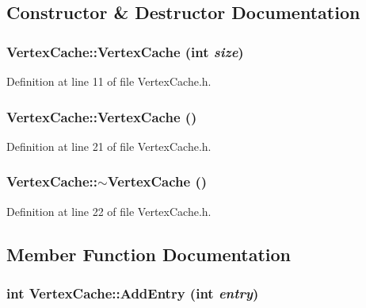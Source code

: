 \subsection{Constructor \& Destructor Documentation}
\hypertarget{class_vertex_cache_587d829d8f0a42dabaa227b15e0ac112}{
\subsubsection[{VertexCache}]{\setlength{\rightskip}{0pt plus 5cm}VertexCache::VertexCache (int {\em size})}}
\label{class_vertex_cache_587d829d8f0a42dabaa227b15e0ac112}




Definition at line 11 of file VertexCache.h.\hypertarget{class_vertex_cache_0cba52679f1eb2fa5567b1a0a3c50df6}{
\subsubsection[{VertexCache}]{\setlength{\rightskip}{0pt plus 5cm}VertexCache::VertexCache ()}}
\label{class_vertex_cache_0cba52679f1eb2fa5567b1a0a3c50df6}




Definition at line 21 of file VertexCache.h.\hypertarget{class_vertex_cache_a2fa6694132b839b3c7faa2a3d60a388}{
\subsubsection[{$\sim$VertexCache}]{\setlength{\rightskip}{0pt plus 5cm}VertexCache::$\sim$VertexCache ()}}
\label{class_vertex_cache_a2fa6694132b839b3c7faa2a3d60a388}




Definition at line 22 of file VertexCache.h.

\subsection{Member Function Documentation}
\hypertarget{class_vertex_cache_cb5d10cb90a7d87391c70c7724ab6064}{
\subsubsection[{AddEntry}]{\setlength{\rightskip}{0pt plus 5cm}int VertexCache::AddEntry (int {\em entry})}}
\label{class_vertex_cache_cb5d10cb90a7d87391c70c7724ab6064}




